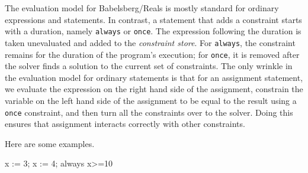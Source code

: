 \documentclass{article}
\newcounter{examples}
\begin{document}
The evaluation model for Babelsberg/Reals is mostly standard for
ordinary expressions and statements.  In contrast, a statement that
adds a constraint starts with a duration, namely \verb|always| or
\verb|once|.  The expression following the duration is taken
unevaluated and added to the \emph{constraint store}.  For
\verb|always|, the constraint remains for the duration of the
program's execution; for \verb|once|, it is removed after the solver
finds a solution to the current set of constraints.  The only wrinkle
in the evaluation model for ordinary statements is that for an
assignment statement, we evaluate the expression on the right hand
side of the assignment, constrain the variable on the left hand side
of the assignment to be equal to the result using a \verb|once|
constraint, and then turn all the constraints over to the solver.
Doing this ensures that assignment interacts correctly with other
constraints.

Here are some examples.

\begin{example}
x := 3;
x := 4;
always x>=10
\end{example}

\end{document}
